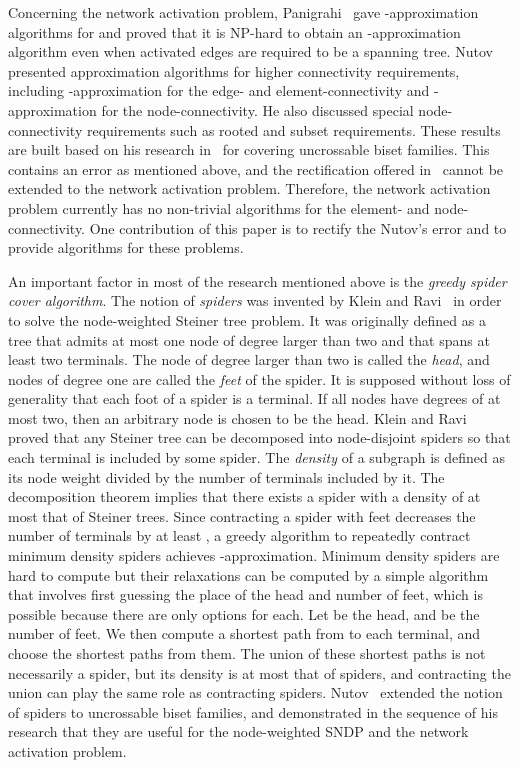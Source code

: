 \documentclass[11pt]{article}
\begin{document}
Concerning the network activation problem, 
Panigrahi~\cite{Panigrahi11wireless} gave -approximation
algorithms for  and proved
that it is NP-hard to obtain an -approximation algorithm even
when activated edges are required to be a spanning tree.
Nutov~\cite{Nutov13activation} presented approximation algorithms for
higher connectivity requirements, including -approximation for
the edge- and element-connectivity and -approximation for
the node-connectivity.
He also discussed special node-connectivity requirements such as rooted and
subset requirements.
These results are built based on his research in~\cite{Nutov12uncrossable} for
covering uncrossable biset families. 
This contains an error as
mentioned above, and 
the rectification offered in~\cite{Vakilian13} cannot be extended to the network
activation problem.
Therefore, the network activation problem currently
has no non-trivial algorithms for the element- and node-connectivity.
One contribution of this paper is to rectify the Nutov's error and to provide
algorithms for these problems.


An important factor
in most of the research mentioned above is the {\em greedy spider cover algorithm}.
The notion of {\em spiders} was invented by Klein and Ravi~\cite{KleinR95} in
order to solve
the node-weighted Steiner tree problem. 
It was originally defined as a tree that admits at most one
node of degree larger than two and that spans at least two terminals.
The node of degree larger than two is called the {\em head}, 
and nodes of degree one are called the {\em feet}
of the spider. 
It is supposed without loss of generality that each foot of a spider is a terminal.
If all nodes have degrees of at most two, then an arbitrary node is chosen to be the head.
Klein and Ravi~\cite{KleinR95} proved that any Steiner tree can be
decomposed into node-disjoint spiders so that each terminal is included by
some spider. The {\em density} of a subgraph is defined as 
its node weight divided by the number of terminals included by it.
The decomposition theorem implies that there exists a spider with a
density of at
most that of Steiner trees. 
Since contracting a spider with  feet decreases the number of
terminals by at least ,
a greedy algorithm to 
repeatedly contract minimum density spiders
achieves -approximation.
Minimum density spiders are hard to compute but their relaxations can be
computed by a simple algorithm that involves first guessing the place of the head and 
number of feet, which is possible
because there are only  options for each. Let  be the head, and
 be the number of feet.
We then compute a shortest path from  to each terminal, and
choose the  shortest paths from them.
The union of these shortest paths is not necessarily a spider, but its
density is at most that of spiders, and contracting the union can play the
same role as contracting spiders.
Nutov~\cite{Nutov10node-weights,Nutov12uncrossable,Nutov13activation}
extended the notion of spiders to uncrossable biset families, and demonstrated in the
sequence of his research that they are useful for the node-weighted SNDP and the
network activation problem.  
\end{document}
